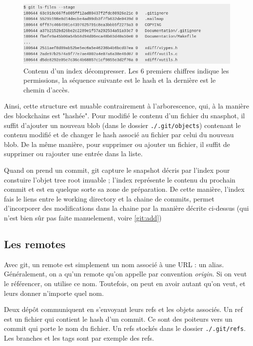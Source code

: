 \documentclass[a4paper, 12pt]{article}
\begin{document}
    \begin{figure}[H]
        \centering
        \includegraphics[width=\textwidth,]{figs/index.png}
        \caption{Contenu d'un index décompresser. Les 6 premiers chiffres
        indique les permissions, la séquence suivante est le hash et la dernière
        est le chemin d'accès.}
        \label{fig:index}
    \end{figure}

    Ainsi, cette structure est muable contrairement à l'arborescence, qui, à la
    manière des blockchains est "hashée". Pour modifié le contenu d'un fichier
    du snasphot, il suffit d'ajouter un nouveau blob (dans le dossier
    \lstinline{./.git/objects}) contenant le contenu modifié et de changer le
    hash associé au fichier par celui du nouveau blob. De la même manière, pour
    supprimer ou ajouter un fichier, il suffit de supprimer ou rajouter une
    entrée dans la liste.

    Quand on prend un commit, git capture le snapshot décris par l'index pour
    constuire l'objet tree root imuable ; l'index représente le contenu du
    prochain commit et est en quelque sorte sa zone de préparation. De cette
    manière, l'index fais le liens entre le working directory et la chaine de
    commits, permet d'incorporer des modifications dans la chaine par la manière
    décrite ci-dessus (qui n'est bien sûr pas faite manuelement, voire
    \ref{git:add})


    \subsection{Les remotes} 

    Avec git, un remote est simplement un nom associé à une URL : un alias.
    Généralement, on a qu'un remote qu'on appelle par convention
    \textit{origin}. Si on veut le référencer, on utilise ce nom. Toutefois, on
    peut en avoir autant qu'on veut, et leurs donner n'importe quel nom.

    Deux dépôt communiquent en s'envoyant leurs refs et les objets associés.
    Un ref est un fichier qui contient le hash d'un commit. Ce sont des poiteurs
    vers un commit qui porte le nom du fichier. Un refs stockés dans le dossier
    \lstinline{./.git/refs}. Les branches et les tags sont par exemple des refs.
\end{document}
